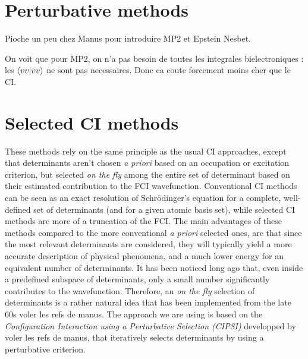 \documentclass[./thesis.tex]{subfiles}
\begin{document}
\section{Perturbative methods}


\alert{Pioche un peu chez Manus pour introduire MP2 et Epstein Nesbet.}



\alert{On voit que pour MP2, on n'a pas besoin de toutes les integrales
bielectroniques : les $\braket{vv}{vv}$ ne sont pas necessaires. Donc ca coute
forcement moins cher que le CI.}

\section{Selected CI methods}

These methods rely on the same principle as the usual CI approaches, except that determinants aren't chosen \textit{a priori} based on an occupation or excitation criterion, but selected \emph{on the fly} among the entire set of determinant based on their estimated contribution to the FCI wavefunction. Conventional CI methods can be seen as an exact resolution of Schrödinger's equation for a complete, well-defined set of determinants (and for a given atomic basis set), while selected CI methods are more of a truncation of the FCI.
The main advantages of these methods compared to the more conventional \textit{a priori} selected ones, are that since the most relevant determinants are considered, they will typically yield a more accurate description of physical phenomena, and a much lower energy for an equivalent number of determinants.
It has been noticed long ago that, even inside a predefined subspace of determinants, only a small number significantly contributes to the wavefunction. Therefore, an \emph{on the fly} selection of determinants is a rather natural idea that has been implemented from the late 60s \alert{voler les refs de manus}. The approach we are using is based on the \emph{Configuration Interaction using a Perturbative Selection (CIPSI)} developped by \alert{voler les refs de manus}, that iteratively selects determinants by using a perturbative criterion. 
\end{document}
